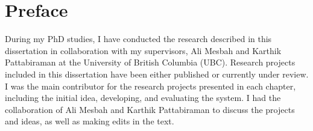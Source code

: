 
\chapter{Preface}
During my PhD studies, I have conducted the research described in this dissertation in collaboration with my supervisors, Ali Mesbah and Karthik Pattabiraman at the University of British Columbia (UBC). 
Research projects included in this dissertation have been either published or currently under review. I was the main contributor for the research projects presented in each chapter, including the initial idea, developing, and evaluating the system. I had the collaboration of Ali Mesbah and Karthik Pattabiraman to discuss the projects and ideas, as well as making edits in the text. 

